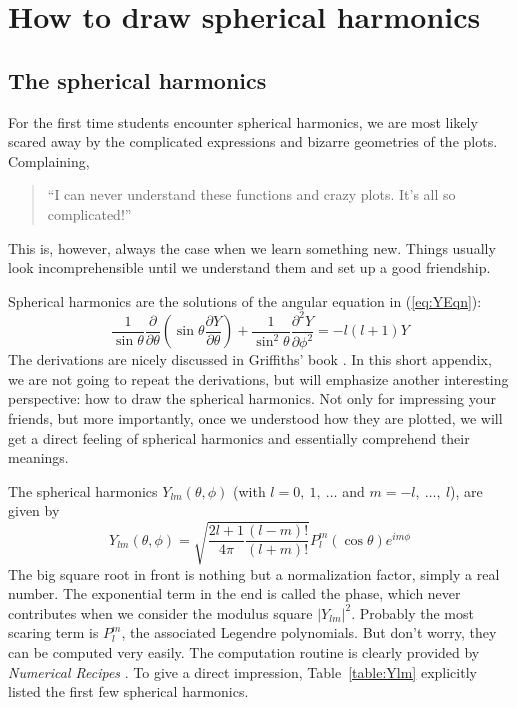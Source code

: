 \chapter{How to draw spherical harmonics} \label{app:A}

\section{The spherical harmonics}
For the first time students encounter spherical harmonics, we are most likely
scared away by the complicated expressions and bizarre geometries of the plots.
Complaining,
\begin{quote}
``I can never understand these functions and crazy plots. It's all so complicated!''
\end{quote}

This is, however, always the case when we learn something new. Things usually look
incomprehensible until we understand them and set up a good friendship.

Spherical harmonics are the solutions of the angular equation in (\ref{eq:YEqn}):
\begin{equation} \label{eq:YEqnAppend}
\frac{1}{\sin{\theta}} \frac{\partial}{\partial \theta} \left( \sin{\theta} \frac{\partial Y}{\partial \theta} \right) + \frac{1}{\sin^2{\theta}} \frac{\partial^2 Y}{\partial \phi^2} = -l(l+1) Y
\end{equation}
%
The derivations are nicely discussed in Griffiths' book \cite{QM}. In this short appendix,
we are not going to repeat the derivations, but will emphasize another interesting
perspective: how to draw the spherical harmonics. Not only for impressing your friends,
but more importantly, once we understood how they are plotted,
we will get a direct feeling of spherical harmonics and essentially comprehend their meanings.

The spherical harmonics $Y_{lm}(\theta,\phi)$ (with $l=0,\ 1,\ \ldots$ and $m=-l,\ \ldots,\ l$),
are given by
\begin{equation} \label{eq:sphaAppend}
Y_{lm}(\theta,\phi) = \sqrt{\frac{2l+1}{4\pi}\frac{(l-m)!}{(l+m)!}} P_l^m(\cos{\theta}) e^{im\phi}
\end{equation}
The big square root in front is nothing but a normalization factor, simply a real number.
The exponential term in the end is called the phase, which never contributes when we
consider the modulus square $|Y_{lm}|^2$. Probably the most scaring term is $P_l^m$, the
associated Legendre polynomials. But don't worry, they can be computed very easily. The computation
routine is clearly provided by \emph{Numerical Recipes} \cite{NR}. To give a direct impression,
Table~\ref{table:Ylm} explicitly listed the first few spherical harmonics.

